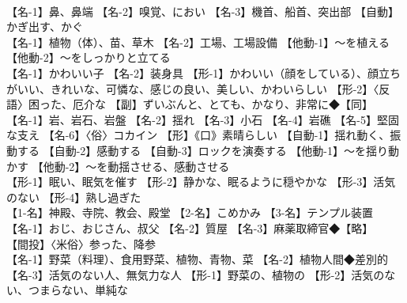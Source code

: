\documentclass[8pt]{extreport}
\begin{document}
\begin{CJK}{UTF8}{min}
\\	【名-1】鼻、鼻端 【名-2】嗅覚、におい 【名-3】機首、船首、突出部 【自動】かぎ出す、かぐ
\\	【名-1】植物（体）、苗、草木 【名-2】工場、工場設備 【他動-1】～を植える 【他動-2】～をしっかりと立てる
\\	【名-1】かわいい子 【名-2】装身具 【形-1】かわいい（顔をしている）、顔立ちがいい、きれいな、可憐な、感じの良い、美しい、かわいらしい 【形-2】〈反語〉困った、厄介な 【副】ずいぶんと、とても、かなり、非常に◆【同】
\\	【名-1】岩、岩石、岩盤 【名-2】揺れ 【名-3】小石 【名-4】岩礁 【名-5】堅固な支え 【名-6】〈俗〉コカイン 【形】《口》素晴らしい 【自動-1】揺れ動く、振動する 【自動-2】感動する 【自動-3】ロックを演奏する 【他動-1】～を揺り動かす 【他動-2】～を動揺させる、感動させる
\\	【形-1】眠い、眠気を催す 【形-2】静かな、眠るように穏やかな 【形-3】活気のない 【形-4】熟し過ぎた
\\	【1-名】神殿、寺院、教会、殿堂 【2-名】こめかみ 【3-名】テンプル装置
\\	【名-1】おじ、おじさん、叔父 【名-2】質屋 【名-3】麻薬取締官◆【略】
\\	【間投】〈米俗〉参った、降参
\\	【名-1】野菜（料理）、食用野菜、植物、青物、菜 【名-2】植物人間◆差別的 【名-3】活気のない人、無気力な人 【形-1】野菜の、植物の 【形-2】活気のない、つまらない、単純な
\end{CJK}
\end{document}
